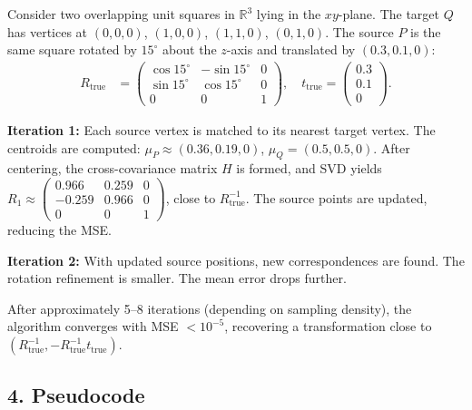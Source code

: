 \begin{example}\label{ex:icp_square}
Consider two overlapping unit squares in $\mathbb{R}^3$ lying in the $xy$-plane. The target $Q$ has vertices at $(0,0,0)$, $(1,0,0)$, $(1,1,0)$, $(0,1,0)$. The source $P$ is the same square rotated by $15^\circ$ about the $z$-axis and translated by $(0.3, 0.1, 0)$:
\begin{align*}
R_{\text{true}} &= \begin{pmatrix} \cos 15^\circ & -\sin 15^\circ & 0 \\ \sin 15^\circ & \cos 15^\circ & 0 \\ 0 & 0 & 1 \end{pmatrix}, \quad t_{\text{true}} = \begin{pmatrix} 0.3 \\ 0.1 \\ 0 \end{pmatrix}.
\end{align*}

\textbf{Iteration 1:} Each source vertex is matched to its nearest target vertex. The centroids are computed: $\mu_P \approx (0.36, 0.19, 0)$, $\mu_Q = (0.5, 0.5, 0)$. After centering, the cross-covariance matrix $H$ is formed, and SVD yields $R_1 \approx \begin{pmatrix} 0.966 & 0.259 & 0 \\ -0.259 & 0.966 & 0 \\ 0 & 0 & 1 \end{pmatrix}$, close to $R_{\text{true}}^{-1}$. The source points are updated, reducing the MSE.

\textbf{Iteration 2:} With updated source positions, new correspondences are found. The rotation refinement is smaller. The mean error drops further.

After approximately 5--8 iterations (depending on sampling density), the algorithm converges with MSE $< 10^{-5}$, recovering a transformation close to $(R_{\text{true}}^{-1}, -R_{\text{true}}^{-1} t_{\text{true}})$.
\end{example}

\subsection{4. Pseudocode}

